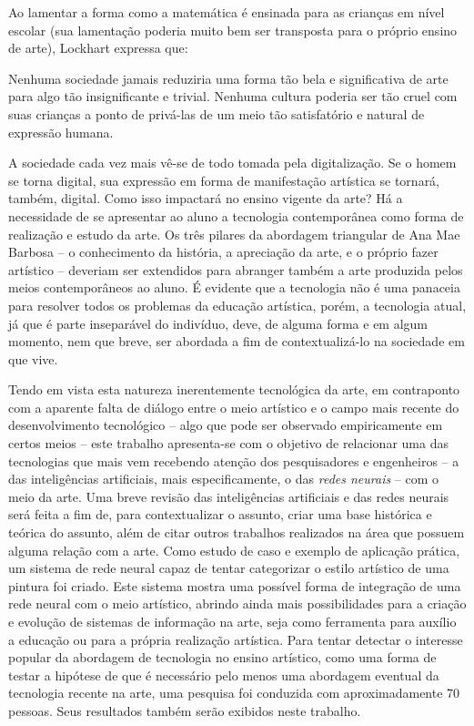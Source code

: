 \documentclass[12pt, a4paper]{article}
\begin{document}
Ao lamentar a forma como a matemática é ensinada para as crianças em nível escolar (sua lamentação poderia muito bem ser transposta para o próprio ensino de arte), Lockhart \cite{lockhart_lament} expressa que:

\begin{displayquote}
Nenhuma sociedade jamais reduziria uma forma tão bela e significativa de arte para algo tão insignificante e trivial. Nenhuma cultura poderia ser tão cruel com suas crianças a ponto de privá-las de um meio tão satisfatório e natural de expressão humana.
\end{displayquote}

A sociedade cada vez mais vê-se de todo tomada pela digitalização. Se o homem se torna digital, sua expressão em forma de 
manifestação artística se tornará, também, digital. Como isso impactará no ensino vigente da arte?
Há a necessidade de se apresentar ao aluno a tecnologia contemporânea como forma de realização e estudo da arte.
Os três pilares da abordagem triangular de Ana Mae Barbosa -- o conhecimento da história, a apreciação da arte, e o próprio fazer artístico --
deveriam ser extendidos para abranger também a arte produzida pelos meios contemporâneos ao aluno.
É evidente que a tecnologia não é uma panaceia para resolver todos os problemas da educação artística, porém, a tecnologia atual, já que é parte
inseparável do indivíduo, deve, de alguma forma e em algum momento, nem que breve, ser abordada a fim de contextualizá-lo na sociedade em que vive.

Tendo em vista esta natureza inerentemente tecnológica da arte, em contraponto com a aparente falta de diálogo entre o meio artístico e o campo
mais recente do desenvolvimento tecnológico -- algo que pode ser observado empiricamente em certos meios -- este trabalho apresenta-se com o objetivo
de relacionar uma das tecnologias que mais vem recebendo atenção dos pesquisadores e engenheiros -- a das inteligências artificiais, mais especificamente,
o das \emph{redes neurais} -- com o meio da arte. 
Uma breve revisão das inteligências artificiais e das redes neurais será feita a fim de, para contextualizar o assunto, criar uma base 
histórica e teórica do assunto, além de citar outros trabalhos realizados na área que possuem alguma relação com a arte.
Como estudo de caso e exemplo de aplicação prática, um sistema de rede neural capaz de tentar categorizar o estilo artístico
de uma pintura foi criado. Este sistema mostra uma possível forma de integração de uma rede neural com o meio artístico, 
abrindo ainda mais possibilidades para a criação e evolução de sistemas de informação na arte, seja como ferramenta para auxílio a educação ou para a própria realização artística. 
Para tentar detectar o interesse popular da abordagem de tecnologia no ensino artístico, como uma forma de testar a hipótese de
que é necessário pelo menos uma abordagem eventual da tecnologia recente na arte, uma pesquisa foi conduzida com aproximadamente 70 pessoas. Seus resultados
também serão exibidos neste trabalho.
\end{document}
